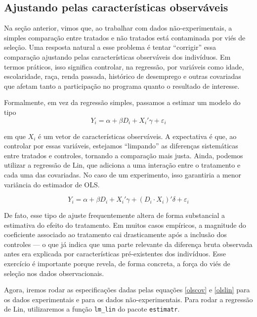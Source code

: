 \subsection{Ajustando pelas características observáveis}

Na seção anterior, vimos que, ao trabalhar com dados não-experimentais, a simples comparação entre tratados e não tratados está contaminada por viés de seleção. Uma resposta natural a esse problema é tentar ``corrigir'' essa comparação ajustando pelas características observáveis dos indivíduos. Em termos práticos, isso significa controlar, na regressão, por variáveis como idade, escolaridade, raça, renda passada, histórico de desemprego e outras covariadas que afetam tanto a participação no programa quanto o resultado de interesse.

Formalmente, em vez da regressão simples, passamos a estimar um modelo do tipo
\begin{equation}\label{olscov}
    Y_i = \alpha + \beta D_i + X_i'\gamma + \varepsilon_i
\end{equation}



em que $X_i$ é um vetor de características observáveis. A expectativa é que, ao controlar por essas variáveis, estejamos ``limpando'' as diferenças sistemáticas entre tratados e controles, tornando a comparação mais justa. Ainda, podemos utilizar a regressão de Lin, que adiciona a uma interação entre o tratamento e cada uma das covariadas. No caso de um experimento, isso garantiria a menor variância do estimador de OLS. 

\begin{equation}\label{olslin}
    Y_i = \alpha 
+ \beta D_i 
+ X_i' \gamma 
+ (D_i \cdot X_i)' \delta 
+ \varepsilon_i
\end{equation}


De fato, esse tipo de ajuste frequentemente altera de forma substancial a estimativa do efeito do tratamento. Em muitos casos empíricos, a magnitude do coeficiente associado ao tratamento cai drasticamente após a inclusão dos controles — o que já indica que uma parte relevante da diferença bruta observada antes era explicada por características pré-existentes dos indivíduos. Esse exercício é importante porque revela, de forma concreta, a força do viés de seleção nos dados observacionais.

Agora, iremos rodar as especificações dadas pelas equações \eqref{olscov} e \eqref{olslin} para os dados experimentais e para os dados não-experimentais. Para rodar a regressão de Lin, utilizaremos a função \texttt{lm\_lin} do pacote \texttt{estimatr}.

